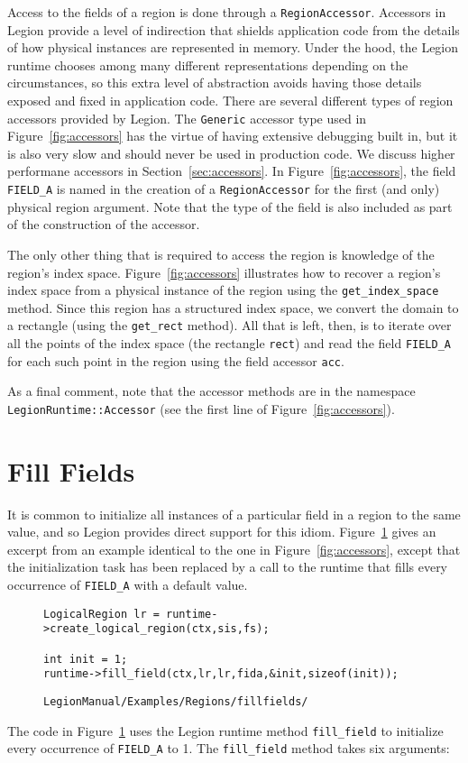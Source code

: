 \documentclass[11pt]{book}
\newcommand{\legionbook}[1]{{\tt LegionManual/Examples/#1}}
\begin{document}
Access to the fields of a region is done through a {\tt RegionAccessor}.  Accessors in Legion provide a level of indirection
that shields application code from the details of how physical instances  are represented in memory.  Under the hood, 
the Legion runtime chooses among many different representations depending on the circumstances, so this extra level
of abstraction avoids having those details exposed and fixed in application code.  There are several different types of
region accessors provided by Legion.  The {\tt Generic} accessor type used in Figure~\ref{fig:accessors} has the virtue of having
extensive debugging built in, but it is also very slow and should never be used in production code.  We discuss higher
performane accessors in Section~\ref{sec:accessors}.
In Figure~\ref{fig:accessors}, the field
{\tt FIELD\_A} is named in the creation of a {\tt RegionAccessor} for the first (and only) physical region argument.
Note that the type of the field is also included as part of the construction of the accessor.

The only other thing that is required to access the region is knowledge of the region's index space.  Figure~\ref{fig:accessors}
illustrates how to recover a region's index space from a physical instance of the region using the {\tt get\_index\_space} method.
Since this region has a structured index space, we convert the domain to a rectangle (using the {\tt get\_rect} method).
All that is left, then, is to iterate over all the points of the index space (the rectangle {\tt rect}) and read the
field {\tt FIELD\_A} for each such point in the region using the field accessor {\tt acc}.

As a final comment, note that the accessor methods are in the namespace {\tt LegionRuntime::Accessor} (see the first line
of Figure~\ref{fig:accessors}).

\section{Fill Fields}
\label{sec:fill}

It is common to initialize all instances of a particular field in a region to the same value, and so Legion
provides direct support for this idiom.  Figure~\ref{fig:fill} gives an excerpt from an example identical
to the one in Figure~\ref{fig:accessors}, except that the initialization task has been replaced by a call to
the runtime that fills every occurrence of {\tt FIELD\_A} with a default value.

\begin{figure}
{\small
\begin{lstlisting}
LogicalRegion lr = runtime->create_logical_region(ctx,sis,fs);

int init = 1;
runtime->fill_field(ctx,lr,lr,fida,&init,sizeof(init));
\end{lstlisting}
}
\caption{\legionbook{Regions/fillfields/}}
\label{fig:fill}
\end{figure}
The code in Figure~\ref{fig:fill} uses the Legion runtime method {\tt fill\_field} to initialize every 
occurrence of {\tt FIELD\_A} to 1.  The {\tt fill\_field} method takes six arguments:
\end{document}

